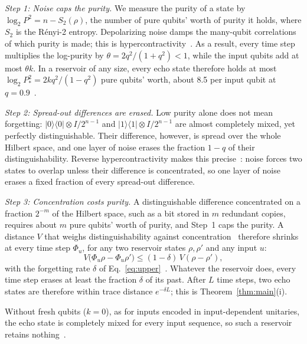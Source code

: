 \documentclass[aps,prl,twocolumn,superscriptaddress,floatfix]{revtex4-2}
\theoremstyle{plain}
\newcommand{\ketbra}[2]{|#1\rangle\!\langle #2|}
\begin{document}
\emph{Step 1: Noise caps the purity.} We measure the purity of a state by $\log_2P^2=n-S_2(\rho)$, the number of pure qubits' worth of purity it holds, where $S_2$ is the R\'enyi-2 entropy. Depolarizing noise damps the many-qubit correlations of which purity is made; this is hypercontractivity~\cite{King2014}. As a result, every time step multiplies the log-purity by $\theta=2q^2/(1+q^2)<1$, while the input qubits add at most $\theta k$. In a reservoir of any size, every echo state therefore holds at most $\log_2P_*^2=2kq^2/(1-q^2)$ pure qubits' worth, about 8.5 per input qubit at $q=0.9$~\cite{SM}.

\emph{Step 2: Spread-out differences are erased.} Low purity alone does not mean forgetting: $\ketbra00\otimes I/2^{n-1}$ and $\ketbra11\otimes I/2^{n-1}$ are almost completely mixed, yet perfectly distinguishable. Their difference, however, is spread over the whole Hilbert space, and one layer of noise erases the fraction $1-q$ of their distinguishability. Reverse hypercontractivity makes this precise~\cite{Cubitt2015}: noise forces two states to overlap unless their difference is concentrated, so one layer of noise erases a fixed fraction of every spread-out difference.

\emph{Step 3: Concentration costs purity.} A distinguishable difference concentrated on a fraction $2^{-m}$ of the Hilbert space, such as a bit stored in $m$ redundant copies, requires about $m$ pure qubits' worth of purity, and Step~1 caps the purity. A distance $V$ that weighs distinguishability against concentration~\cite{SM} therefore shrinks at every time step $\Phi_u$, for any two reservoir states $\rho,\rho'$ and any input $u$:
\begin{equation}
V\bigl(\Phi_u\rho-\Phi_u\rho'\bigr)\le(1-\delta)\,V(\rho-\rho'),
\label{eq:contraction}
\end{equation}
with the forgetting rate $\delta$ of Eq.~\eqref{eq:upper}~\cite{SM}. Whatever the reservoir does, every time step erases at least the fraction $\delta$ of its past. After $L$ time steps, two echo states are therefore within trace distance $e^{-\delta L}$; this is Theorem~\ref{thm:main}(i).

Without fresh qubits ($k=0$), as for inputs encoded in input-dependent unitaries, the echo state is completely mixed for every input sequence, so such a reservoir retains nothing~\cite{Aharonov1996,SM}.
\end{document}
